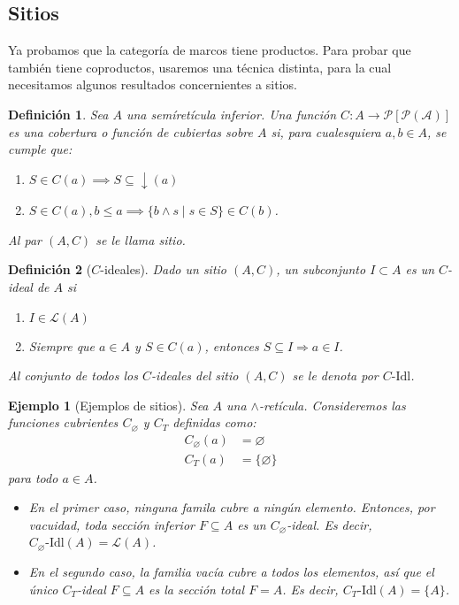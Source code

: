 \documentclass[12pt,letterpaper,titlepage]{article}
\let\emptyset\varnothing
\newtheorem*{defn}{Definición}
\newtheorem*{exa}{Ejemplo}
\theoremstyle{definition}
\newcommand\down{{\downarrow}}
\renewcommand\inf{\wedge}
\renewcommand\cal[1]{\mathcal{#1}}
\newcommand\<{\langle}
\renewcommand\>{\rangle}
\newcommand\Idl{\text{-}\mathrm{Idl}}
\begin{document}
\subsection{Sitios}

Ya probamos que la categoría de marcos tiene productos.
Para probar que también tiene coproductos,
usaremos una técnica distinta, para la cual necesitamos
algunos resultados concernientes a sitios.

\begin{defn}
    Sea $A$ una semíretícula inferior.
    Una función $C:A\to\mathcal{P}[\mathcal{P(A)}]$
    es una \textit{cobertura} o \textit{función de cubiertas}
    sobre $A$ si,
    para cualesquiera $a,b\in A$, se cumple que:
    \begin{enumerate}
        \item $S\in C(a) \implies S\subseteq\down(a)$
        \item $S\in C(a), b\leq a \implies \{b\wedge s\mid s\in S\}\in C(b)$.
    \end{enumerate}
    Al par $(A,C)$ se le llama sitio.
\end{defn}
\begin{defn}[$C$-ideales]
    Dado un sitio $(A,C)$, un subconjunto
    $I\subset A$ es un $C$-ideal de $A$ si
    \begin{enumerate}
        \item $I\in\mathcal{L}(A)$
        \item Siempre que $a\in A$ y $S\in C(a)$, entonces
        $S\subseteq I\Rightarrow a\in I$.
    \end{enumerate}
    Al conjunto de todos los $C$-ideales del sitio $(A,C)$
    se le denota por $C\Idl$.
\end{defn}
\begin{exa}[Ejemplos de sitios]
    Sea $A$ una $\inf$-retícula.
    Consideremos las funciones cubrientes 
    $C_\emptyset$ y $C_T$ definidas como:
    \begin{align*}
        C_\emptyset(a) &= \emptyset \\
        C_T(a) &= \{\emptyset\}
    \end{align*}
    para todo $a\in A$.
    \begin{itemize}
        \item
        En el primer caso,
        ninguna famila cubre a ningún elemento.
        Entonces, por vacuidad,
        toda sección inferior $F\subseteq A$ es
        un $C_\emptyset$-ideal.
        Es decir, $C_\emptyset\Idl(A)=\cal L(A)$.
        \item
        En el segundo caso,
        la familia vacía cubre a todos los elementos,
        así que el único $C_T$-ideal $F\subseteq A$
        es la sección total $F=A$.
        Es decir, $C_T\Idl(A)=\{A\}$.
    \end{itemize}
\end{exa}
\end{document}

